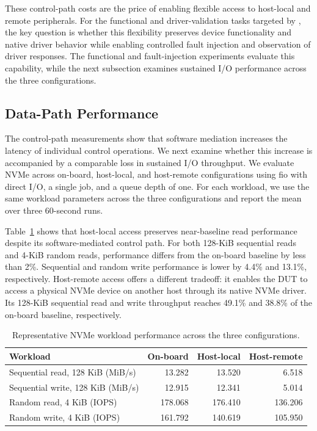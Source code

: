 These control-path costs are the price of enabling flexible access to
host-local and remote peripherals. For the functional and driver-validation
tasks targeted by \sys, the key question is whether this flexibility preserves
device functionality and native driver behavior while enabling controlled
fault injection and observation of driver responses. The functional and
fault-injection experiments evaluate this capability, while the next subsection
examines sustained I/O performance across the three configurations.



\subsection{Data-Path Performance}
\label{sec:data-path-performance}

The control-path measurements show that software mediation increases the
latency of individual control operations. We next examine whether this
increase is accompanied by a comparable loss in sustained I/O throughput.
We evaluate NVMe across on-board, host-local, and host-remote configurations
using fio with direct I/O, a single job, and a queue depth of one. For each
workload, we use the same workload parameters across the three configurations
and report the mean over three 60-second runs.

Table~\ref{tab:nvme} shows that host-local access preserves near-baseline read
performance despite its software-mediated control path. For both 128-KiB
sequential reads and 4-KiB random reads, performance differs from the on-board
baseline by less than 2\%. Sequential and random write performance is lower
by 4.4\% and 13.1\%, respectively. Host-remote access offers a different
tradeoff: it enables the DUT to access a physical NVMe device on another host
through its native NVMe driver. Its 128-KiB sequential read and write
throughput reaches 49.1\% and 38.8\% of the on-board baseline, respectively.

\begin{table}[!htb]
\centering
\caption{Representative NVMe workload performance across the three configurations.}
\label{tab:nvme}
\small
\setlength{\tabcolsep}{3pt}
\begin{tabularx}{\columnwidth}{@{}Xrrr@{}}
\toprule
Workload & On-board & Host-local & Host-remote \\
\midrule
Sequential read, 128 KiB (MiB/s) & 13.282 & 13.520 & 6.518 \\
Sequential write, 128 KiB (MiB/s) & 12.915 & 12.341 & 5.014 \\
Random read, 4 KiB (IOPS) & 178.068 & 176.410 & 136.206 \\
Random write, 4 KiB (IOPS) & 161.792 & 140.619 & 105.950 \\
\bottomrule
\end{tabularx}
\end{table}



